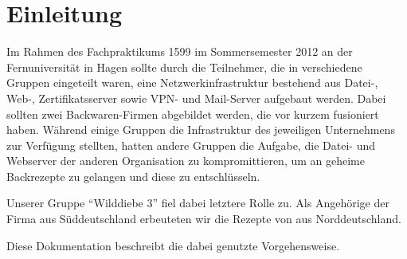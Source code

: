 \section{Einleitung}

Im Rahmen des Fachpraktikums 1599 im Sommersemester 2012 an der Fernuniversität
in Hagen sollte durch die Teilnehmer, die in verschiedene Gruppen eingeteilt
waren, eine Netzwerkinfrastruktur bestehend aus Datei-, Web-, Zertifikatsserver
sowie VPN- und Mail-Server aufgebaut werden. Dabei sollten zwei Backwaren-Firmen
abgebildet werden, die vor kurzem fusioniert haben. Während einige Gruppen die
Infrastruktur des jeweiligen Unternehmens zur Verfügung stellten, hatten andere
Gruppen die Aufgabe, die Datei- und Webserver der anderen Organisation zu
kompromittieren, um an geheime Backrezepte zu gelangen und diese zu
entschlüsseln.

Unserer Gruppe ``Wilddiebe 3'' fiel dabei letztere Rolle zu. Als Angehörige der
Firma \Muellerbrot{} aus Süddeutschland erbeuteten wir die Rezepte von
\Mayerbrot{} aus Norddeutschland.

Diese Dokumentation beschreibt die dabei genutzte Vorgehensweise.


